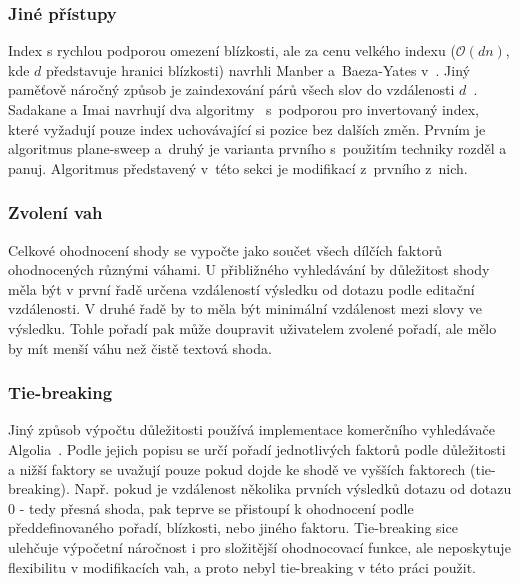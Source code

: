 \documentclass[11pt,letterpaper,oneside,openright]{book}
\begin{document}
\subsubsection{Jiné přístupy}
Index s rychlou podporou omezení blízkosti, ale za cenu velkého indexu
($\mathcal{O}(dn)$, kde $d$ představuje hranici blízkosti) navrhli Manber
a~Baeza-Yates v~\cite{MANBER1991133}. Jiný paměťově náročný způsob je
zaindexování párů všech slov do vzdálenosti $d$~\cite{Aref95}. Sadakane a Imai
navrhují dva algoritmy~\cite{Sadakane99textretrieval} s~podporou pro
invertovaný index, které vyžadují pouze index uchovávající si pozice bez
dalších změn. Prvním je algoritmus plane-sweep a~druhý je varianta prvního
s~použitím techniky rozděl a panuj. Algoritmus představený v~této sekci je
modifikací z~prvního z~nich.

\subsubsection{Zvolení vah}
Celkové ohodnocení shody se vypočte jako součet všech dílčích faktorů
ohodnocených různými váhami. U přibližného vyhledávání by důležitost shody měla
být v první řadě určena vzdáleností výsledku od dotazu podle editační
vzdálenosti. V druhé řadě by to měla být minimální vzdálenost mezi slovy ve
výsledku. Tohle pořadí pak může doupravit uživatelem zvolené pořadí, ale mělo
by mít menší váhu než čistě textová shoda.

\subsubsection{Tie-breaking} \label{sec:tie-breaking}
Jiný způsob výpočtu důležitosti používá implementace komerčního vyhledávače
Algolia~\cite{algolia_website,algolia_ranking}. Podle jejich popisu se určí
pořadí jednotlivých faktorů podle důležitosti a nižší faktory se uvažují pouze
pokud dojde ke shodě ve vyšších faktorech (tie-breaking). Např. pokud je
vzdálenost několika prvních výsledků dotazu od dotazu 0 - tedy přesná shoda,
pak teprve se přistoupí k ohodnocení podle předdefinovaného pořadí, blízkosti,
nebo jiného faktoru. Tie-breaking sice ulehčuje výpočetní náročnost i pro
složitější ohodnocovací funkce, ale neposkytuje flexibilitu v modifikacích vah,
a proto nebyl tie-breaking v této práci použit.
\end{document}
